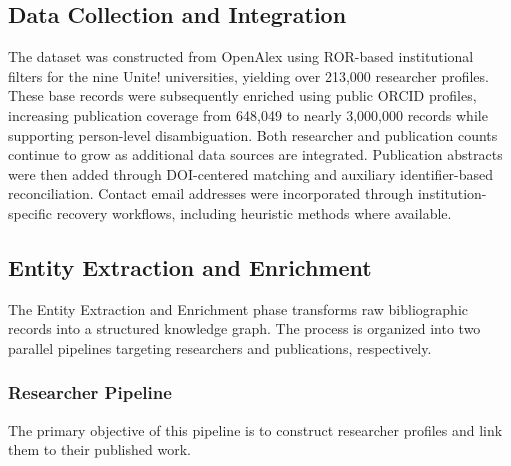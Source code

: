 \documentclass[sigconf, nonacm]{acmart}
\begin{document}
\subsection{Data Collection and Integration}
The dataset was constructed from OpenAlex using ROR-based institutional filters for the nine Unite! universities, yielding over 213,000 researcher profiles. These base records were subsequently enriched using public ORCID profiles, increasing publication coverage from 648,049 to nearly 3,000,000 records while supporting person-level disambiguation. Both researcher and publication counts continue to grow as additional data sources are integrated. Publication abstracts were then added through DOI-centered matching and auxiliary identifier-based reconciliation. Contact email addresses were incorporated through institution-specific recovery workflows, including heuristic methods where available.

\subsection{Entity Extraction and Enrichment}

The Entity Extraction and Enrichment phase transforms raw bibliographic records into a structured knowledge graph. The process is organized into two parallel pipelines targeting researchers and publications, respectively.

\subsubsection*{Researcher Pipeline}
The primary objective of this pipeline is to construct researcher profiles and link them to their published work.
\end{document}
